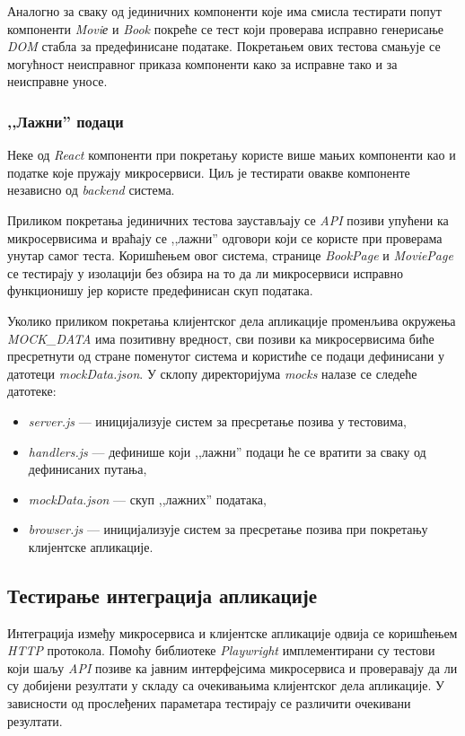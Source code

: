 \documentclass[12pt,oneside]{memoir}
\begin{document}
Аналогно за сваку од јединичних компоненти које има смисла тестирати попут компоненти \textit{Moviе} и \textit{Book} покреће се тест који проверава исправно генерисање \textit{DOM} стабла за предефинисане податаке. Покретањем ових тестова смањује се могућност неисправног приказа компоненти како за исправне тако и за неисправне уносе.
 
\subsubsection{,,Лажни” подаци}

Неке од \textit{React} компоненти при покретању користе више мањих компоненти као и податке које пружају микросервиси. Циљ је тестирати овакве компоненте независно од \textit{backend} система.

Приликом покретања јединичних тестова заустављају се \textit{API} позиви упућени ка микросервисима и враћају се ,,лажни” одговори који се користе при проверама унутар самог теста.  Коришћењем овог система, странице \textit{BookPage} и \textit{MoviePage} се тестирају  у изолацији без обзира на то да ли микросервиси исправно функционишу јер користе предефинисан скуп података.

Уколико приликом покретања клијентског дела апликације променљива окружења \textit{MOCK\_DATA} има позитивну вредност, сви позиви ка микросервисима биће пресретнути од стране поменутог система и користиће се подаци дефинисани у датотеци \textit{mockData.json}. У склопу директоријума \textit{mocks} налазе се следеће датотеке:

\begin{itemize}
\item \textit{server.js} --- иницијализује систем за пресретање позива у тестовима,
\item \textit{handlers.js} --- дефинише који ,,лажни” подаци ће се вратити за сваку од дефинисаних путања,
\item \textit{mockData.json} --- скуп ,,лажних” података,
\item \textit{browser.js} --- иницијализује систем за пресретање позива при покретању клијентске апликације.
\end{itemize}


\subsection{Тестирање интеграција апликације}

Интеграција између микросервиса и клијентске апликације одвија се коришћењем \textit{HTTP} протокола. Помоћу библиотеке \textit{Playwright} имплементирани су тестови који шаљу \textit{API} позиве ка јавним интерфејсима микросервиса и проверавају да ли су добијени резултати у складу са очекивањима клијентског дела апликације. У зависности од прослеђених параметара тестирају се различити очекивани резултати.
\end{document}

